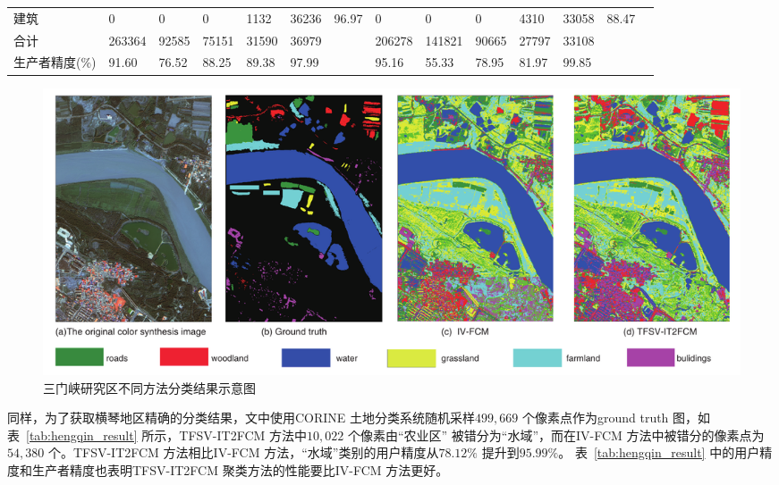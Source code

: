 \begin{table}[htbp]
{\begin{adjustbox}{max width=1.15\textwidth}
\begin{tabular} {llllllllllllll}
            建筑                                          & 0                                        & 0                                                 & 0                          & 1132                                              & 36236 & 96.97 & 0      & 0      & 0     & 4310  & 33058 & 88.47 \\
            合计                                          & 263364                                   & 92585                                             & 75151                      & 31590                                             & 36979 &       & 206278 & 141821 & 90665 & 27797 & 33108 &       \\
            生产者精度(\%)                                & 91.60                                    & 76.52                                             & 88.25                      & 89.38                                             & 97.99 &       & 95.16  & 55.33  & 78.95 & 81.97 & 99.85 &       \\
            \bottomrule
        \end{tabular}
    \end{adjustbox}}
\end{table}

\begin{figure}[htbp]
    \centering
    \includegraphics[width=1.0\textwidth]{figures/sanmenxia}
    \caption{三门峡研究区不同方法分类结果示意图 }\label{fig:sanmenxia}
\end{figure}

同样，为了获取横琴地区精确的分类结果，文中使用CORINE 土地分类系统随机采样$499,669$ 个像素点作为ground truth 图，如表~\ref{tab:hengqin_result} 所示，TFSV-IT2FCM 方法中$10,022$ 个像素由“农业区” 被错分为“水域”，而在IV-FCM 方法中被错分的像素点为$54,380$ 个。TFSV-IT2FCM 方法相比IV-FCM 方法，“水域”类别的用户精度从$78.12\%$ 提升到$95.99\%$。 表~\ref{tab:hengqin_result} 中的用户精度和生产者精度也表明TFSV-IT2FCM 聚类方法的性能要比IV-FCM 方法更好。

